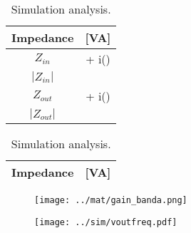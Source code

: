 \begin{table}[H]
    \begin{minipage}{.5\textwidth}
    \centering
    \vspace{3mm}
    \begin{table}[H]
    \centering
    \begin{tabular}{|c|c|}
    	\hline
        Impedance &  [VA]\\ 
        \hline
        $Z_{in}$ &  + i()\\ \hline
        $|Z_{in}|$ & \\ \hline
        $Z_{out}$ &  + i()\\ \hline
        $|Z_{out}|$ & \\ \hline
    \end{tabular}
	\end{table}
    \caption{Theoretical analysis.}
    \end{minipage}
    \begin{minipage}{.5\textwidth}
     \begin{table}[H]
    \centering 
    \begin{tabular}{|c|c|}
    	\hline
    	Impedance & [VA]\\ 
    	\hline
         
         
    \end{tabular}
	\end{table}
	\caption{Simulation analysis.} 
    \end{minipage}
\end{table}

\begin{table}[H]
    \begin{minipage}{.5\textwidth}
    \centering
    \begin{figure}[H]
    \centering
    \texttt{[image: ../mat/gain\_banda.png]}
	\end{figure}
    \caption{Theoretical analysis.}
    \end{minipage}
    \begin{minipage}{.5\textwidth}
	\begin{figure}[H]
    \centering
    \texttt{[image: ../sim/voutfreq.pdf]}
	\end{figure}
	\caption{Simulation analysis.} 
    \end{minipage}
\end{table}


